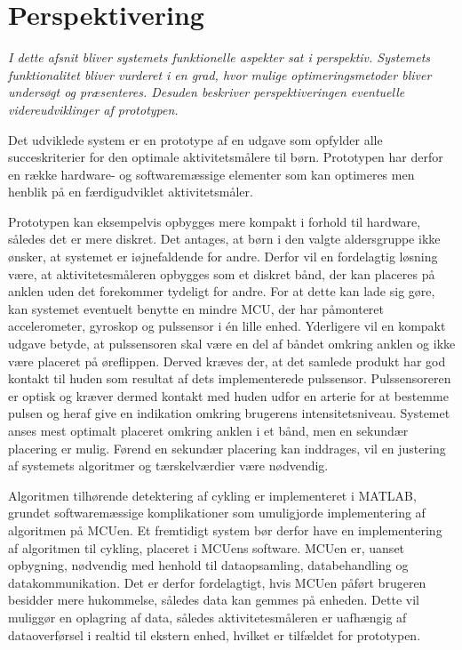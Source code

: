 \section{Perspektivering}
\textit{I dette afsnit bliver systemets funktionelle aspekter sat i perspektiv. Systemets funktionalitet bliver vurderet i en grad, hvor mulige optimeringsmetoder bliver undersøgt og præsenteres. Desuden beskriver perspektiveringen eventuelle videreudviklinger af prototypen.}

Det udviklede system er en prototype af en udgave som opfylder alle succeskriterier for den optimale aktivitetsmålere til børn. Prototypen har derfor en række hardware- og softwaremæssige elementer som kan optimeres men henblik på en færdigudviklet aktivitetsmåler.

Prototypen kan eksempelvis opbygges mere kompakt i forhold til hardware, således det er mere diskret. Det antages, at børn i den valgte aldersgruppe ikke ønsker, at systemet er iøjnefaldende for andre. Derfor vil en fordelagtig løsning være, at aktivitetesmåleren opbygges som et diskret bånd, der kan placeres på anklen uden det forekommer tydeligt for andre. For at dette kan lade sig gøre, kan systemet eventuelt benytte en mindre MCU, der har påmonteret accelerometer, gyroskop og pulssensor i én lille enhed. Yderligere vil en kompakt udgave betyde, at pulssensoren skal være en del af båndet omkring anklen og ikke være placeret på øreflippen. Derved kræves der, at det samlede produkt har god kontakt til huden som resultat af dets implementerede pulssensor. Pulssensoreren er optisk og kræver dermed kontakt med huden udfor en arterie for at bestemme pulsen og heraf give en indikation omkring brugerens intensitetsniveau. Systemet anses mest optimalt placeret omkring anklen i et bånd, men en sekundær placering er mulig. Førend en sekundær placering kan inddrages, vil en justering af systemets algoritmer og tærskelværdier være nødvendig. 

Algoritmen tilhørende detektering af cykling er implementeret i MATLAB, grundet softwaremæssige komplikationer som umuligjorde implementering af algoritmen på MCUen. Et fremtidigt system bør derfor have en implementering af algoritmen til cykling, placeret i MCUens software. MCUen er, uanset opbygning, nødvendig med henhold til dataopsamling, databehandling og datakommunikation. Det er derfor fordelagtigt, hvis MCUen påført brugeren besidder mere hukommelse, således data kan gemmes på enheden. Dette vil muliggør en oplagring af data, således aktivitetesmåleren er uafhængig af dataoverførsel i realtid til ekstern enhed, hvilket er tilfældet for prototypen. 


